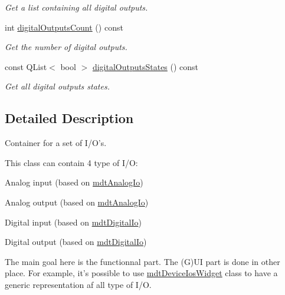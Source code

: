 \begin{DoxyCompactItemize}
\begin{DoxyCompactList}\small\item\em Get a list containing all digital outputs. \end{DoxyCompactList}\item 
\hypertarget{classmdt_device_ios_a81041e03a387fdcdc2638527b27a0ff6}{
int \hyperlink{classmdt_device_ios_a81041e03a387fdcdc2638527b27a0ff6}{digitalOutputsCount} () const }
\label{classmdt_device_ios_a81041e03a387fdcdc2638527b27a0ff6}

\begin{DoxyCompactList}\small\item\em Get the number of digital outputs. \end{DoxyCompactList}\item 
\hypertarget{classmdt_device_ios_a13a10727750161e49c3a56917ceb1ffe}{
const QList$<$ bool $>$ \hyperlink{classmdt_device_ios_a13a10727750161e49c3a56917ceb1ffe}{digitalOutputsStates} () const }
\label{classmdt_device_ios_a13a10727750161e49c3a56917ceb1ffe}

\begin{DoxyCompactList}\small\item\em Get all digital outputs states. \end{DoxyCompactList}\end{DoxyCompactItemize}


\subsection{Detailed Description}
Container for a set of I/O's. 

This class can contain 4 type of I/O:
\begin{DoxyItemize}
\item Analog input (based on \hyperlink{classmdt_analog_io}{mdtAnalogIo})
\item Analog output (based on \hyperlink{classmdt_analog_io}{mdtAnalogIo})
\item Digital input (based on \hyperlink{classmdt_digital_io}{mdtDigitalIo})
\item Digital output (based on \hyperlink{classmdt_digital_io}{mdtDigitalIo})
\end{DoxyItemize}

The main goal here is the functionnal part. The (G)UI part is done in other place. For example, it's possible to use \hyperlink{classmdt_device_ios_widget}{mdtDeviceIosWidget} class to have a generic representation af all type of I/O.

